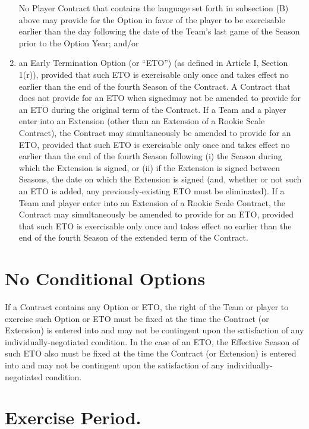 \documentclass[
]{book}
\begin{document}
\begin{enumerate}
  No Player Contract that contains the language set forth in subsection (B) above may provide for the Option in favor of the player to be exercisable earlier than the day following the date of the Team's last game of the Season prior to the Option Year; and/or
\item
  an Early Termination Option (or ``ETO'') (as defined in Article I, Section 1(r)), provided that such ETO is exercisable only once and takes effect no earlier than the end of the fourth Season of the Contract. A Contract that does not provide for an ETO when signedmay not be amended to provide for an ETO during the original term of the Contract. If a Team and a player enter into an Extension (other than an Extension of a Rookie Scale Contract), the Contract may simultaneously be amended to provide for an ETO, provided that such ETO is exercisable only once and takes effect no earlier than the end of the fourth Season following (i) the Season during which the Extension is signed, or (ii) if the Extension is signed between Seasons, the date on which the Extension is signed (and, whether or not such an ETO is added, any previously-existing ETO must be eliminated). If a Team and player enter into an Extension of a Rookie Scale Contract, the Contract may simultaneously be amended to provide for an ETO, provided that such ETO is exercisable only once and takes effect no earlier than the end of the fourth Season of the extended term of the Contract.
\end{enumerate}

\hypertarget{no-conditional-options}{%
\section{No Conditional Options}\label{no-conditional-options}}

If a Contract contains any Option or ETO, the right of the Team or player to exercise such Option or ETO must be fixed at the time the Contract (or Extension) is entered into and may not be contingent upon the satisfaction of any individually-negotiated condition. In the case of an ETO, the Effective Season of such ETO also must be fixed at the time the Contract (or Extension) is entered into and may not be contingent upon the satisfaction of any individually-negotiated condition.

\hypertarget{exercise-period.}{%
\section{Exercise Period.}\label{exercise-period.}}
\end{document}
